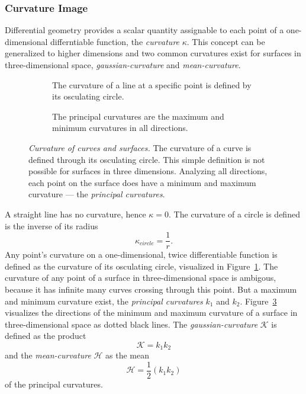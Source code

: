 \subsubsection{Curvature Image}

Differential geometry provides a scalar quantity assignable to each point of a one-dimensional differntiable function, the \emph{\gls{curvature}} $\kappa$\cite[p. 10]{Kuhnel2008}.
This concept can be generalized to higher dimensions and two common \glspl{curvature} exist for surfaces in three-dimensional space, \emph{\gls{gaussian-curvature}} and \emph{\gls{mean-curvature}}.
\begin{figure}[H]
    \begin{subfigure}[t]{0.48\textwidth}
        \centering
        \scalebox{0.85}{%
        
        }
        \caption{The \gls{curvature} of a line at a specific point is defined by its osculating circle.}\label{fig:osculating_circle}
    \end{subfigure}\hfill%
    \begin{subfigure}[t]{0.48\textwidth}
        \centering
        \scalebox{0.85}{%
        
        }
        \caption{The principal curvatures are the maximum and minimum \glspl{curvature} in all directions.}\label{fig:curvature_surface}
    \end{subfigure}
    \caption[Curvature of curves and surfaces]{\emph{Curvature of curves and surfaces.} The \gls{curvature} of a curve is defined through its osculating circle. This simple definition is not possible for surfaces in three dimensions. Analyzing all directions, each point on the surface does have a minimum and maximum \gls{curvature} --- the \emph{principal curvatures}.}
\end{figure}
A straight line has no \gls{curvature}, hence $\kappa = 0$.
The \gls{curvature} of a circle is defined is the inverse of its radius
\begin{equation}
    \kappa_{circle} = \frac{1}{r}\text{.}
\end{equation}
Any point's \gls{curvature} on a one-dimensional, twice differentiable function is defined as the \gls{curvature} of its osculating circle, visualized in Figure~\ref{fig:osculating_circle}.
The \gls{curvature} of any point of a surface in three-dimensional space is ambigous, because it has infinite many curves crossing through this point.
But a maximum and minimum \gls{curvature} exist, the \emph{principal curvatures} $k_1$ and $k_2$.
Figure~\ref{fig:curvature_surface} visualizes the directions of the minimum and maximum \gls{curvature} of a surface in three-dimensional space as dotted black lines.
The \emph{\Gls{gaussian-curvature}} $\mathcal{K}$ is defined as the product
\[
    \mathcal{K} = k_1 k_2
\]
and the \emph{\gls{mean-curvature}} $\mathcal{H}$ as the mean
\[
    \mathcal{H} = \frac{1}{2} (k_1 k_2)
\]
of the principal curvatures.


